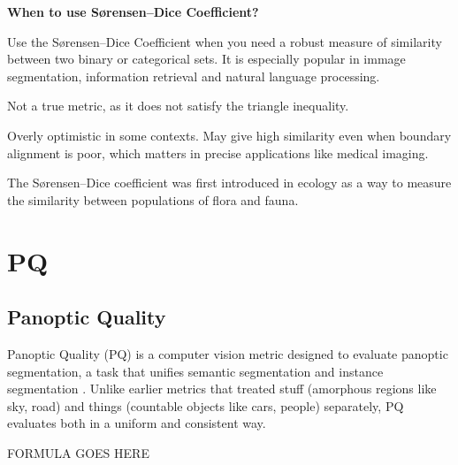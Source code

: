 \textbf{When to use S{\o}rensen–Dice Coefficient?}

Use the S{\o}rensen–Dice Coefficient when you need a robust measure of similarity between two binary
or categorical sets. It is especially popular in immage segmentation, information retrieval and
natural language processing.

{
\item Not a true metric, as it does not satisfy the triangle inequality.
\item Overly optimistic in some contexts. May give high similarity even when boundary alignment
is poor, which matters in precise applications like medical imaging.
}

\clearpage

\thispagestyle{customstyle}

{The S{\o}rensen–Dice coefficient was first introduced in ecology as a way to measure the similarity
between populations of flora and fauna.}

\vspace{-5pt}


\clearpage
\thispagestyle{cvstyle}
\section{PQ}
\subsection{Panoptic Quality}

Panoptic Quality (PQ) is a computer vision metric designed to evaluate panoptic segmentation, a task
that unifies semantic segmentation and instance segmentation . Unlike earlier metrics that treated stuff
(amorphous regions like sky, road) and things (countable objects like cars, people) separately,
PQ evaluates both in a uniform and consistent way.

\begin{center}
    FORMULA GOES HERE
\end{center}

